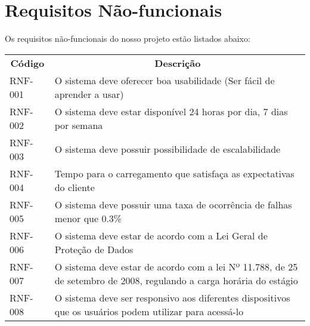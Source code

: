 \section{Requisitos Não-funcionais}

Os requisitos não-funcionais do nosso projeto estão listados abaixo:

\begin{table}[]
	\begin{tabular}{ll}
		\multicolumn{1}{c}{\textbf{Código}} & \multicolumn{1}{c}{\textbf{Descrição}} \\
		RNF-001                             & O sistema deve oferecer boa usabilidade (Ser fácil de aprender a usar)                                                                 \\
		RNF-002                             & O sistema deve estar disponível 24 horas por dia, 7 dias por semana                                                                    \\
		RNF-003                             & O sistema deve possuir possibilidade de escalabilidade                                                                                 \\
		RNF-004                             & Tempo para o carregamento que satisfaça as expectativas do cliente                                                                     \\
		RNF-005                             & O sistema deve possuir uma taxa de ocorrência de falhas menor que 0.3\%                                                                \\
		RNF-006                             & O sistema deve estar de acordo com a Lei Geral de Proteção de Dados                                                                    \\
		RNF-007                             & O sistema deve estar de acordo com a lei Nº 11.788, de 25 de setembro de 2008, regulando a carga horária do estágio                    \\
		RNF-008                             & O sistema deve ser responsivo aos diferentes dispositivos que os usuários podem utilizar para acessá-lo                                      
	\end{tabular}
\end{table}

